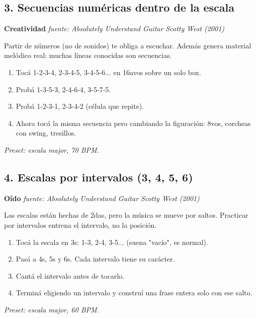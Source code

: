 \documentclass[11pt,a4paper]{article}
\begin{document}
\subsection{3. Secuencias numéricas dentro de la escala}
\textbf{Creatividad} \hfill \emph{fuente: Absolutely Understand Guitar \textemdash{} Scotty West (2001)}
\par Partir de números (no de sonidos) te obliga a escuchar. Además genera material melódico real: muchas líneas conocidas son secuencias.
\begin{enumerate}
\item Tocá 1-2-3-4, 2-3-4-5, 3-4-5-6... en 16avos sobre un solo box.
\item Probá 1-3-5-3, 2-4-6-4, 3-5-7-5.
\item Probá 1-2-3-1, 2-3-4-2 (célula que repite).
\item Ahora tocá la misma secuencia pero cambiando la figuración: 8vos, corcheas con swing, tresillos.
\end{enumerate}
\emph{Preset: escala major, 70 BPM.}
\subsection{4. Escalas por intervalos (3\textordfeminine{}, 4\textordfeminine{}, 5\textordfeminine{}, 6\textordfeminine{})}
\textbf{Oído} \hfill \emph{fuente: Absolutely Understand Guitar \textemdash{} Scotty West (2001)}
\par Las escalas están hechas de 2das, pero la música se mueve por saltos. Practicar por intervalos entrena el intervalo, no la posición.
\begin{enumerate}
\item Tocá la escala en 3\textordfeminine{}s: 1-3, 2-4, 3-5... (suena "vacío", es normal).
\item Pasá a 4\textordfeminine{}s, 5\textordfeminine{}s y 6\textordfeminine{}s. Cada intervalo tiene su carácter.
\item Cantá el intervalo antes de tocarlo.
\item Terminá eligiendo un intervalo y construí una frase entera solo con ese salto.
\end{enumerate}
\emph{Preset: escala major, 60 BPM.}
\end{document}

